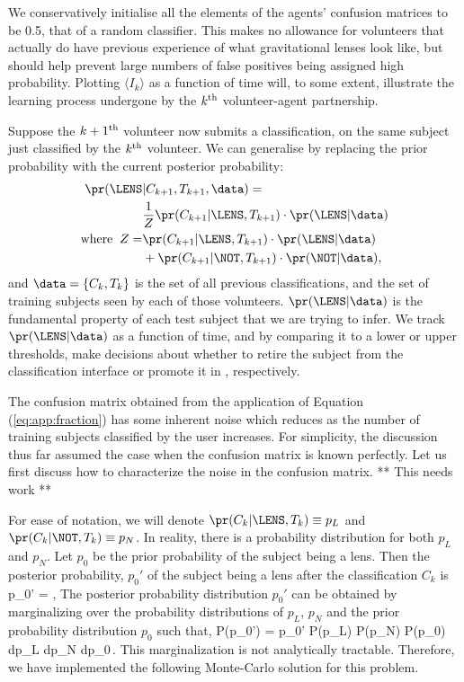 \documentclass[useAMS,usenatbib,a4paper]{mn2e}
\begin{document}
We conservatively initialise all the elements of the agents' confusion matrices
to be 0.5, that of a random classifier. This makes no allowance for volunteers
that actually do have previous experience of what gravitational lenses look
like, but should help prevent large numbers of false positives being assigned
high probability. Plotting  $\langle I_k \rangle$ as a function of time will,
to some extent, illustrate the learning process undergone by the $k^{\rm th}$
volunteer-agent partnership.

Suppose the $k+1^{\rm th}$ volunteer now submits a classification, on the same
subject just classified by the $k^{\rm th}$ volunteer. We can generalise
 by replacing the prior probability with the current
posterior probability:
\begin{align}
  \label{eq:app:update}
  \pr(\LENS & |C_{k+1},T_{k+1},\data) = \\
  & \frac{1}{Z} \pr(C_{k+1}|\LENS,T_{k+1}) \cdot \pr(\LENS|\data) \\ \notag
{\rm where}\;\; Z = & \pr(C_{k+1}|\LENS,T_{k+1})\cdot\pr(\LENS|\data) \\ \notag
      & + \pr(C_{k+1}|\NOT,T_{k+1})\cdot\pr(\NOT|\data), \notag
\end{align}
and $\data = \{C_k,T_k\}$ is the set of all previous
classifications, and the set of training subjects seen by each of those
volunteers.
$\pr(\LENS|\data)$ is the fundamental property of each test subject that
we are trying to infer. We track $\pr(\LENS|\data)$ as a function of time,
and by comparing it to a lower or upper thresholds, make decisions about
whether to retire the subject from the classification interface or
promote it in \Talk, respectively.

The confusion matrix obtained from the application of Equation
(\ref{eq:app:fraction}) has some inherent noise which reduces as the number
of training subjects classified by the user increases. For simplicity, the
discussion thus far assumed the case when the confusion matrix is known
perfectly. Let us first discuss how to characterize the noise in the confusion
matrix. ** This needs work **


For ease of notation, we will denote $\pr(C_k|\LENS,T_k)\equiv p_L$ and
$\pr(C_k|\NOT,T_k)\equiv p_N$. In reality, there is a probability distribution
for both $p_L$ and $p_N$. Let $p_0$ be the prior probability of the subject
being a lens. Then the posterior probability, $p_0'$ of the subject being a
lens after the classification $C_k$ is
\be
  \label{eq:app:sec}
p_0' = ,
\ee
The posterior probability distribution $p_0'$ can be obtained by marginalizing
over the probability distributions of $p_L$, $p_N$ and the prior probability
distribution $p_0$ such that,
\be
P(p_0') = \int p_0' P(p_L) P(p_N) P(p_0) dp_L dp_N dp_0\,.
\ee
This marginalization is not analytically tractable. Therefore, we have
implemented the following Monte-Carlo solution for this problem.
\end{document}
